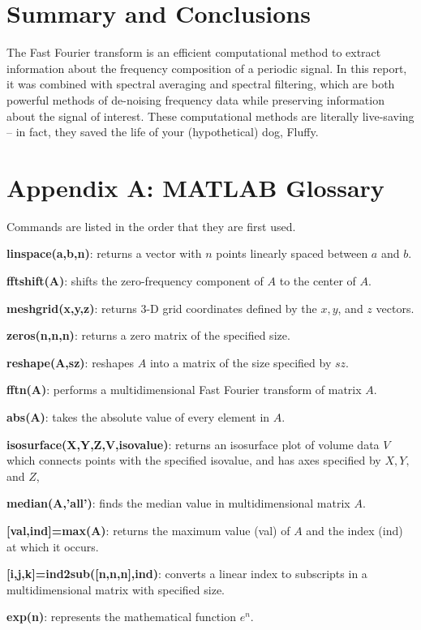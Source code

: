 \documentclass[a4paper,12 pt]{article}
\begin{document}
\section{Summary and Conclusions}
The Fast Fourier transform is an efficient computational method to extract information about the frequency composition of a periodic signal. In this report, it was combined with spectral averaging and spectral filtering, which are both powerful methods of de-noising frequency data while preserving information about the signal of interest. These computational methods are literally live-saving -- in fact, they saved the life of your (hypothetical) dog, Fluffy.


\section{Appendix A: MATLAB Glossary}
Commands are listed in the order that they are first used.

\textbf{linspace(a,b,n)}: returns a vector with $n$ points linearly spaced between $a$ and $b$.

\textbf{fftshift(A)}: shifts the zero-frequency component of $A$ to the center of $A$.

\textbf{meshgrid(x,y,z)}: returns 3-D grid coordinates defined by the $x, y$, and $z$ vectors.

\textbf{zeros(n,n,n)}: returns a zero matrix of the specified size.

\textbf{reshape(A,sz)}: reshapes $A$ into a matrix of the size specified by $sz$.

\textbf{fftn(A)}: performs a multidimensional Fast Fourier transform of matrix $A$.

\textbf{abs(A)}: takes the absolute value of every element in $A$.

\textbf{isosurface(X,Y,Z,V,isovalue)}: returns an isosurface plot of volume data $V$ which connects points with the specified isovalue, and has axes specified by $X,Y,$ and $Z$, 

\textbf{median(A,'all')}: finds the median value in multidimensional matrix $A$.

\textbf{[val,ind]=max(A)}: returns the maximum value (val) of $A$ and the index (ind) at which it occurs.

\textbf{[i,j,k]=ind2sub([n,n,n],ind)}: converts a linear index to subscripts in a multidimensional matrix with specified size.

\textbf{exp(n)}: represents the mathematical function $e^n$.
\end{document}
